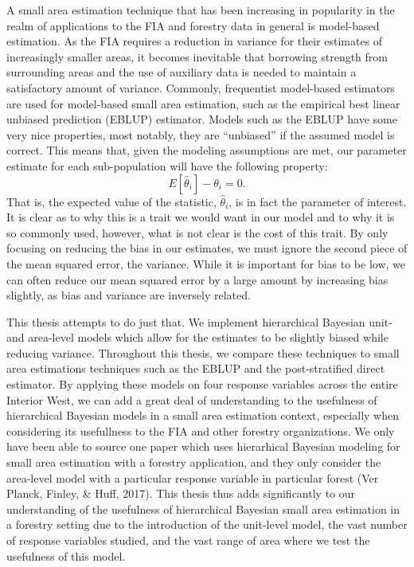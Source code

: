 \documentclass[12pt,twoside]{reedthesis}
\begin{document}
A small area estimation technique that has been increasing in popularity in the realm of applications to the FIA and forestry data in general is model-based estimation. As the FIA requires a reduction in variance for their estimates of increasingly smaller areas, it becomes inevitable that borrowing strength from surrounding areas and the use of auxiliary data is needed to maintain a satisfactory amount of variance. Commonly, frequentist model-based estimators are used for model-based small area estimation, such as the empirical best linear unbiased prediction (EBLUP) estimator. Models such as the EBLUP have some very nice properties, most notably, they are ``unbiased'' if the assumed model is correct. This means that, given the modeling assumptions are met, our parameter estimate for each sub-population will have the following property:
\[
E[\hat \theta_i] - \theta_i = 0.
\]
That is, the expected value of the statistic, \(\hat \theta_i\), is in fact the parameter of interest. It is clear as to why this is a trait we would want in our model and to why it is so commonly used, however, what is not clear is the cost of this trait. By only focusing on reducing the bias in our estimates, we must ignore the second piece of the mean squared error, the variance. While it is important for bias to be low, we can often reduce our mean squared error by a large amount by increasing bias slightly, as bias and variance are inversely related.

This thesis attempts to do just that. We implement hierarchical Bayesian unit- and area-level models which allow for the estimates to be slightly biased while reducing variance. Throughout this thesis, we compare these techniques to small area estimations techniques such as the EBLUP and the post-stratified direct estimator. By applying these models on four response variables across the entire Interior West, we can add a great deal of understanding to the usefulness of hierarchical Bayesian models in a small area estimation context, especially when considering its usefullness to the FIA and other forestry organizations. We only have been able to source one paper which uses hierarhical Bayesian modeling for small area estimation with a forestry application, and they only consider the area-level model with a particular response variable in particular forest (Ver Planck, Finley, \& Huff, 2017). This thesis thus adds significantly to our understanding of the usefulness of hierarchical Bayesian small area estimation in a forestry setting due to the introduction of the unit-level model, the vast number of response variables studied, and the vast range of area where we test the usefulness of this model.
\end{document}

